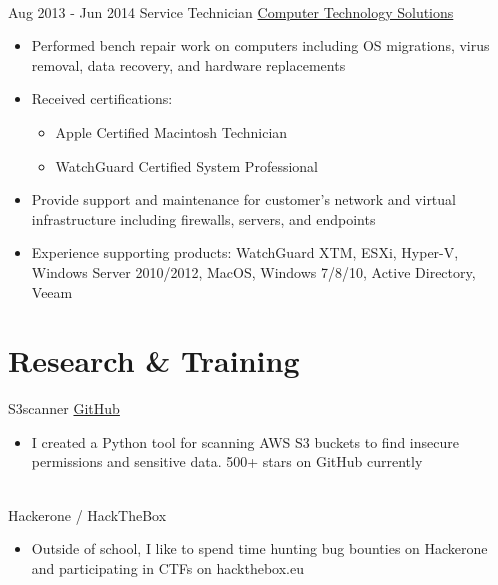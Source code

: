 \documentclass[letterpaper]{twentysecondcv} %
\begin{document}
\begin{twenty}
{{\begin{itemize}
    \end{itemize}}
        }
     \\
     \twentyitem
   		{Aug 2013 -}
		{Jun 2014}
        {Service Technician}
        {\href{https://www.yourcts.net}{Computer Technology Solutions}}
        {}
        {
        \begin{itemize}
        \item Performed bench repair work on computers including OS migrations, virus removal, data recovery, and hardware replacements
        \item Received certifications: \begin{itemize}
            \item Apple Certified Macintosh Technician
            \item WatchGuard Certified System Professional
        \end{itemize}
        \item Provide support and maintenance for customer's network and virtual infrastructure including firewalls, servers, and endpoints
        \item Experience supporting products: WatchGuard XTM, ESXi, Hyper-V, Windows Server 2010/2012, MacOS, Windows 7/8/10, Active Directory, Veeam
        
    \end{itemize}
    	}
        
\end{twenty}

\section{Research \& Training}

\begin{twenty}
    \twentyitem
    	{\hspace{10mm} \Large \faDatabase}
		{}
        {S3scanner}
        {\href{https://github.com/sa7mon/s3scanner}{GitHub}}
        {}
        {\begin{itemize}
        \item I created a Python tool for scanning AWS S3 buckets to find insecure permissions and sensitive data. 500+ stars on GitHub currently
        \end{itemize}}
    \\
     \twentyitem
    	{\hspace{10mm} \Large \faGlobe}
		{}
        {Hackerone / HackTheBox}
        {}
        {}
        {\begin{itemize}
        \item Outside of school, I like to spend time hunting bug bounties on Hackerone and participating in CTFs on hackthebox.eu
        \end{itemize}}
\end{twenty}
\end{document}
